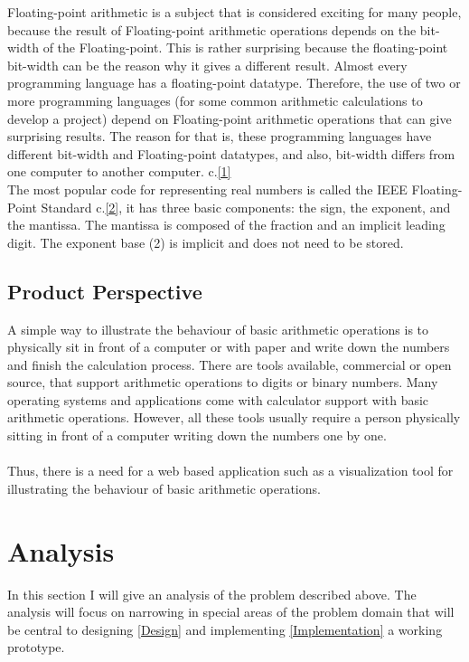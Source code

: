 \documentclass[11pt]{article}
\begin{document}
Floating-point arithmetic is a subject that is considered exciting for many people, because the result of Floating-point arithmetic operations depends on the bit-width of the Floating-point. This is rather surprising because the floating-point bit-width can be the reason why it gives a different result. Almost every programming language has a floating-point datatype. Therefore, the use of two or more programming languages (for some common arithmetic calculations to develop a project) depend on Floating-point arithmetic operations that can give surprising results. The reason for that is, these programming languages have different bit-width and Floating-point datatypes, and also, bit-width differs from one computer to another computer. c.\ref{1}\\

The most popular code for representing real numbers is called the IEEE Floating-Point Standard c.\ref{2}, it has three basic components: the sign, the exponent, and the mantissa. The mantissa is composed of the fraction and an implicit leading digit. The exponent base (2) is implicit and does not need to be stored.\\

\subsection{Product Perspective}
A simple way to illustrate the behaviour of basic arithmetic operations is to physically sit in front of a computer or with paper and write down the numbers and finish the calculation process. There are tools available, commercial or open source, that support arithmetic operations to digits or binary numbers. Many operating systems and applications come with calculator support with basic arithmetic operations. However, all these tools usually require a person physically sitting in front of a computer writing down the numbers one by one.\\
\\Thus, there is a need for a web based application such as a visualization tool for illustrating the behaviour of basic arithmetic operations.

\section{Analysis}
In this section I will give an analysis of the problem described above. The analysis will focus on narrowing in special areas of the problem domain that will be central to designing \ref{Design} and implementing \ref{Implementation} a working prototype.
\end{document}
